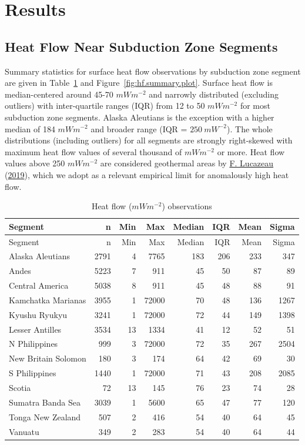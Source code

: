 \documentclass[draft,linenumbers]{agujournal2018}
\begin{document}
\clearpage

\section{Results}

\subsection{Heat Flow Near Subduction Zone Segments}

Summary statistics for surface heat flow observations by subduction zone
segment are given in Table~\ref{tbl:hf.summary.table} and
Figure~\ref{fig:hf.summary.plot}. Surface heat flow is median-centered
around 45-70 \(mWm^{-2}\) and narrowly distributed (excluding outliers)
with inter-quartile ranges (IQR) from 12 to 50 \(mWm^{-2}\) for most
subduction zone segments. Alaska Aleutians is the exception with a
higher median of 184 \(mWm^{-2}\) and broader range (IQR =
\(250~mW^{-2}\)). The whole distributions (including outliers) for all
segments are strongly right-skewed with maximum heat flow values of
several thousand of \(mWm^{-2}\) or more. Heat flow values above 250
\(mWm^{-2}\) are considered geothermal areas by
\protect\hyperlink{ref-lucazeau2019}{F. Lucazeau}
(\protect\hyperlink{ref-lucazeau2019}{2019}), which we adopt as a
relevant empirical limit for anomalously high heat flow.

\hypertarget{tbl:hf.summary.table}{}
\begin{longtable}[]{@{}lrrrrrrr@{}}
\caption{\label{tbl:hf.summary.table}Heat flow (\(mWm^{-2}\))
observations}\tabularnewline
\toprule
Segment & n & Min & Max & Median & IQR & Mean & Sigma \\
\midrule
\endfirsthead
\toprule
Segment & n & Min & Max & Median & IQR & Mean & Sigma \\
\midrule
\endhead
Alaska Aleutians & 2791 & 4 & 7765 & 183 & 206 & 233 & 347 \\
Andes & 5223 & 7 & 911 & 45 & 50 & 87 & 89 \\
Central America & 5038 & 8 & 911 & 45 & 48 & 88 & 91 \\
Kamchatka Marianas & 3955 & 1 & 72000 & 70 & 48 & 136 & 1267 \\
Kyushu Ryukyu & 3241 & 1 & 72000 & 72 & 44 & 149 & 1398 \\
Lesser Antilles & 3534 & 13 & 1334 & 41 & 12 & 52 & 51 \\
N Philippines & 999 & 3 & 72000 & 72 & 35 & 267 & 2504 \\
New Britain Solomon & 180 & 3 & 174 & 64 & 42 & 69 & 30 \\
S Philippines & 1440 & 1 & 72000 & 71 & 43 & 208 & 2085 \\
Scotia & 72 & 13 & 145 & 76 & 23 & 74 & 28 \\
Sumatra Banda Sea & 3039 & 1 & 5600 & 65 & 47 & 77 & 120 \\
Tonga New Zealand & 507 & 2 & 416 & 54 & 40 & 64 & 45 \\
Vanuatu & 349 & 2 & 283 & 54 & 40 & 64 & 44 \\
\bottomrule
\end{longtable}
\end{document}
